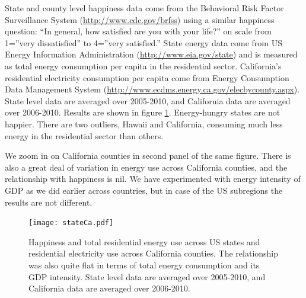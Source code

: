 \documentclass[10pt, letterpaper]{article}
\begin{document}
\begin{spacing}{1.5}
State and county level happiness data come from the Behavioral Risk Factor
Surveillance System (\url{http://www.cdc.gov/brfss}) using a similar happiness question: ``In general,
how satisfied are you with your life?'' on scale 
from 1=''very dissatisfied'' to 4=''very satisfied.'' State energy  data come from
US Energy Information Administration (\url{http://www.eia.gov/state})  and is measured as total energy
consumption per capita in the residential sector.  
California's  residential electricity consumption per capita come from 
Energy Consumption Data Management System
(\url{http://www.ecdms.energy.ca.gov/elecbycounty.aspx}). State level data are
averaged over 2005-2010, and California data are
averaged over 2006-2010.
Results are shown in
figure \ref{stateCaPAP}. Energy-hungry states  are not happier. %
 There are two outliers, Hawaii and California, consuming much less energy in
the residential sector than others. 

We zoom in on California counties in
second panel of the same figure. There is also a great deal of variation in energy
use across California counties, and the relationship with happiness is nil. 
We have  experimented with energy intensity of
GDP as we did earlier across countries, but in case of the US subregions the results are
not different. %

\begin{figure}[H]
 \texttt{[image: stateCa.pdf]}\centering
\caption{Happiness and total residential energy use across US states and
  residential electricity use across   
  California counties.  %
 The relationship was also quite flat in terms of total energy consumption and
 its GDP intensity. State level data are averaged over 2005-2010, and California data are averaged over 2006-2010.
}\label{stateCaPAP}
 \end{figure} %


\end{spacing}
\end{document}
